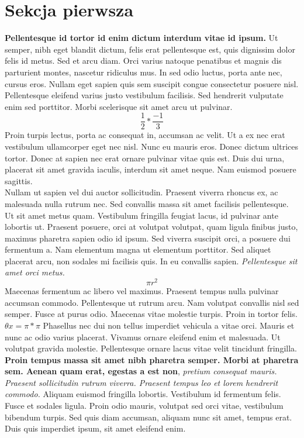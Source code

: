 \documentclass[12pt,a4paper]{article}
\begin{document}
	\section{Sekcja pierwsza}
	\textbf{Pellentesque id tortor id enim dictum interdum vitae id ipsum.} Ut semper, nibh eget blandit dictum, felis erat pellentesque est, quis dignissim dolor felis id metus. Sed et arcu diam. Orci varius natoque penatibus et magnis dis parturient montes, nascetur ridiculus mus. In sed odio luctus, porta ante nec, cursus eros. Nullam eget sapien quis sem suscipit congue consectetur posuere nisl. Pellentesque eleifend varius justo vestibulum facilisis. Sed hendrerit vulputate enim sed porttitor. Morbi scelerisque sit amet arcu ut pulvinar.
    $$
        \frac{1}{2}*\frac{-1}{3}
    $$
    Proin turpis lectus, porta ac consequat in, accumsan ac velit. Ut a ex nec erat vestibulum ullamcorper eget nec nisl. Nunc eu mauris eros. Donec dictum ultrices tortor. Donec at sapien nec erat ornare pulvinar vitae quis est. Duis dui urna, placerat sit amet gravida iaculis, interdum sit amet neque. Nam euismod posuere sagittis. \\Nullam ut sapien vel dui auctor sollicitudin. Praesent viverra rhoncus ex, ac malesuada nulla rutrum nec. Sed convallis massa sit amet facilisis pellentesque. Ut sit amet metus quam. Vestibulum fringilla feugiat lacus, id pulvinar ante lobortis ut. Praesent posuere, orci at volutpat volutpat, quam ligula finibus justo, maximus pharetra sapien odio id ipsum. Sed viverra suscipit orci, a posuere dui fermentum a. Nam elementum magna ut elementum porttitor. Sed aliquet placerat arcu, non sodales mi facilisis quis. In eu convallis sapien. \textit{Pellentesque sit amet orci metus. }
    $$
        \pi r^2
    $$
	Maecenas fermentum ac libero vel maximus. Praesent tempus nulla pulvinar accumsan commodo. Pellentesque ut rutrum arcu. Nam volutpat convallis nisl sed semper. Fusce at purus odio. Maecenas vitae molestie turpis. Proin in tortor felis. $\theta x = \pi*\pi$ Phasellus nec dui non tellus imperdiet vehicula a vitae orci. Mauris et nunc ac odio varius placerat. Vivamus ornare eleifend enim et malesuada. Ut volutpat gravida molestie. Pellentesque ornare lacus vitae velit tincidunt fringilla.  \textbf{Proin tempus massa sit amet nibh pharetra semper. Morbi at pharetra sem. Aenean quam erat, egestas a est non}, \textit{pretium consequat mauris. \\Praesent sollicitudin rutrum viverra. Praesent tempus leo et lorem hendrerit commodo.} Aliquam euismod fringilla lobortis. Vestibulum id fermentum felis. Fusce et sodales ligula. Proin odio mauris, volutpat sed orci vitae, vestibulum bibendum turpis. Sed quis diam accumsan, aliquam nunc sit amet, tempus erat. Duis quis imperdiet ipsum, sit amet eleifend enim. 
\end{document}
